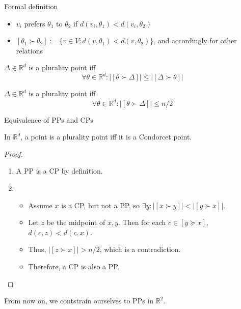 \documentclass{beamer}
\newcommand{\RR}{\mathbb{R}}
\newcommand{\preferers}[3][\succ]{[#2 #1 #3]}
\newcommand{\npreferers}[3][\succ]{\lvert\preferers[#1]{#2}{#3}\rvert}
\newcommand{\eqspacing}[2]{%
  \setlength\abovedisplayskip{#1}%
  \setlength\belowdisplayskip{#2}%
}
\begin{document}
\begin{frame}{Formal definition}
  \begin{definition}[Preference]
    \begin{itemize}
    \item \(v_i\) prefers \(\theta_1\) to \(\theta_2\) if \(d(v_i, \theta_1) < d(v_i, \theta_2)\)
    \item \(\preferers{\theta_1}{\theta_2}  := \{v \in V : d(v, \theta_1) < d(v, \theta_2)\}\), and
      accordingly for other relations
    \end{itemize}
  \end{definition}
  \begin{definition}
    \eqspacing{0pt}{0pt}
    \(\Delta \in \RR^d\) is a plurality point iff
    \begin{equation*}
      \forall \theta \in \RR^d : \npreferers{\theta}{\Delta} \leq \npreferers{\Delta}{\theta}
    \end{equation*}
  \end{definition}
  \begin{definition}
    \eqspacing{0pt}{0pt}
    \(\Delta \in \RR^d\) is a plurality point iff
    \begin{equation*}
      \forall \theta \in \RR^d : \npreferers{\theta}{\Delta} \leq n/2
    \end{equation*}
  \end{definition}
\end{frame}


\begin{frame}{Equivalence of PPs and CPs}
  \begin{lemma}[Equivalence]  %
    In \(\RR^d\), a point is a plurality point iff it is a Condorcet point.
  \end{lemma}
  \begin{proof}
    \begin{enumerate}
    \item A PP is a CP by definition.
    \item
      \begin{itemize}
      \item Assume \(x\) is a CP, but not a PP, so
        \(\exists y: \npreferers{x}{y} < \npreferers{y}{x}\).
      \item Let \(z\) be the midpoint of \(x, y\).  Then for each
        \(c \in \preferers[\succeq]{y}{x}\), \(d(c, z) < d(c, x)\).
      \item Thus, \(\npreferers{z}{x} > n/2\), which is a contradiction.
      \item Therefore, a CP is also a PP.
      \end{itemize}
    \end{enumerate}
  \end{proof}

  From now on, we contstrain ourselves to PPs in \(\RR^2\).  
\end{frame}
\end{document}

